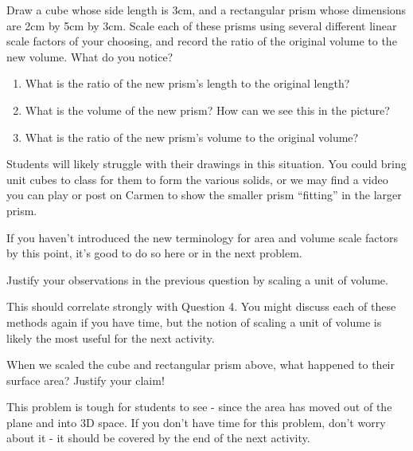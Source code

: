 \documentclass[nooutcomes]{ximera}
\begin{document}
\begin{problem}
Draw a cube whose side length is 3cm, and a rectangular prism whose dimensions are 2cm by 5cm by 3cm.  Scale each of these prisms using several different linear scale factors of your choosing, and record the ratio of the original volume to the new volume.  What do you notice?
\vskip 2.3in
\begin{enumerate}
    \item What is the ratio of the new prism's length to the original  length?
    \item What is the volume of the new prism?  How can we see this in the picture?
    \item What is the ratio of the new prism's volume to the original volume?
\end{enumerate}
\begin{instructorNotes}
Students will likely struggle with their drawings in this situation.  You could bring unit cubes to class for them to form the various solids, or we may find a video you can play or post on Carmen to show the smaller prism ``fitting'' in the larger prism.  

If you haven't introduced the new terminology for area and volume scale factors by this point, it's good to do so here or in the next problem.
\end{instructorNotes}
\end{problem}

\begin{problem}
Justify your observations in the previous question by scaling a unit of volume.
\begin{instructorNotes}
This should correlate strongly with Question 4.  You might discuss each of these methods again if you have time, but the notion of scaling a unit of volume is likely the most useful for the next activity.
\end{instructorNotes}
\end{problem}

\begin{problem}
When we scaled the cube and rectangular prism above, what happened to their surface area?  Justify your claim!

\begin{instructorNotes}
This problem is tough for students to see - since the area has moved out of the plane and into 3D space.  If you don't have time for this problem, don't worry about it - it should be covered by the end of the next activity.
\end{instructorNotes}
\end{problem}
\end{document}
